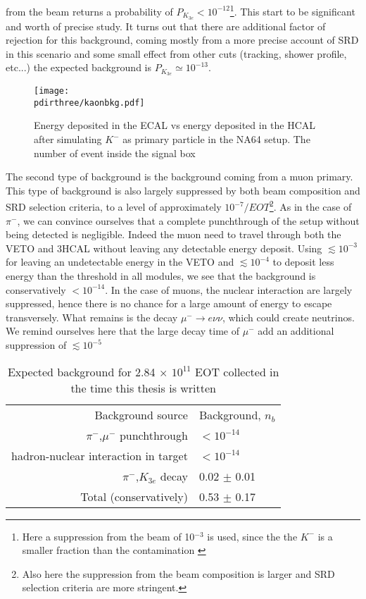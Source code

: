 from the beam returns a probability of $P_{K_{3e}} < 10^{-12}$\footnote{Here a suppression from the beam of 10$^{-3}$ is used, since the the $K^-$ is a smaller fraction than the contamination \cite{h4-beamline}}. This start to be significant and worth of precise study. It turns out that there are additional factor of rejection for this background, coming mostly from a more precise account of SRD in this scenario and some small effect from other cuts (tracking, shower profile, etc...) the expected background is $P_{K_{3e}} \simeq 10^{-13}$.


\begin{figure}[bth!]
  \centering
  \texttt{[image: \\pdirthree/kaonbkg.pdf]}
  \caption[$K^-$ simulation ]{Energy deposited in the ECAL vs energy deposited in the HCAL after simulating $K^-$ as primary particle in the NA64 setup. The number of event inside the signal box}
  \label{fig:kaonbkg-sim}
\end{figure}

The second type of background is the background coming from a muon primary. This type of background is also largely suppressed by both beam composition and SRD selection criteria, to a level of approximately $10^{-7}/EOT$\footnote{Also here the suppression from the beam composition is larger \cite{h4-beamline} and SRD selection criteria are more stringent.}. As in the case of $\pi^-$, we can convince ourselves that a complete punchthrough of the setup without being detected is negligible. Indeed the muon need to travel through both the VETO and 3HCAL without leaving any detectable energy deposit. Using $\lesssim 10^{-3}$ for leaving an undetectable energy in the VETO and $\lesssim 10^{-4}$ to deposit less energy than the threshold in all modules, we see that the background is conservatively $< 10^{-14}$. In the case of muons, the nuclear interaction are largely suppressed, hence there is no chance for a large amount of energy to escape transversely. What remains is the decay $\mu^- \rightarrow e\nu\nu$, which could create neutrinos. We remind ourselves here that the large decay time of $\mu^-$ add an additional suppression of $\lesssim 10^{-5}$



\begin{table}[bth!]
  \centering
  \begin{tabular}{|r|l|}
    \hline \\
    \hline
    Background source & Background, $n_b$ \\
    \hline
    $\pi^-$,$\mu^-$ punchthrough & $<10^{-14}$ \\
    hadron-nuclear interaction in target & $<10^{-14}$ \\
    $\pi^-$,$K_{3e}$ decay & 0.02 $\pm$ 0.01 \\
    \hline
    Total (conservatively) & 0.53 $\pm$ 0.17

                        
  \end{tabular}
  \caption[invisible mode background]{Expected background for 2.84 $\times$ $10^{11}$ EOT collected in the time this thesis is written }
  \label{tab:inv-bkg}
\end{table}


